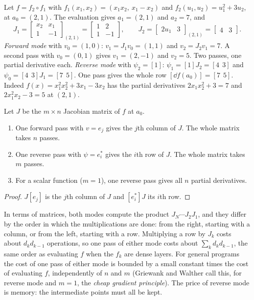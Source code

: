 \begin{notechapter}
\begin{example}\label{chain-rule-autodiff:ex:hand}
Let $f = f_2\circ f_1$ with
$f_1(x_1, x_2) = (x_1x_2,\ x_1 - x_2)$ and
$f_2(u_1, u_2) = u_1^2 + 3u_2$, at $a_0 = (2, 1)$. The evaluation gives
$a_1 = (2, 1)$ and $a_2 = 7$, and
\[
  J_1 = \begin{bmatrix}x_2 & x_1\\1 & -1\end{bmatrix}_{(2, 1)}
      = \begin{bmatrix}1 & 2\\1 & -1\end{bmatrix},
  \qquad
  J_2 = \begin{bmatrix}2u_1 & 3\end{bmatrix}_{(2, 1)}
      = \begin{bmatrix}4 & 3\end{bmatrix} .
\]
\emph{Forward mode} with $v_0 = (1, 0)$: $v_1 = J_1v_0 = (1, 1)$ and
$v_2 = J_2v_1 = 7$. A second pass with $v_0 = (0, 1)$ gives
$v_1 = (2, -1)$ and $v_2 = 5$. Two passes, one partial derivative each.
\emph{Reverse mode} with $\psi_2 = [1]$: $\psi_1 = [1]J_2 = [4\ \ 3]$ and
$\psi_0 = [4\ \ 3]J_1 = [7\ \ 5]$. One pass gives the whole row
$[\dd f(a_0)] = [7\ \ 5]$. Indeed
$f(x) = x_1^2x_2^2 + 3x_1 - 3x_2$ has the partial derivatives
$2x_1x_2^2 + 3 = 7$ and $2x_1^2x_2 - 3 = 5$ at $(2, 1)$.
\end{example}

\begin{proposition}\label{chain-rule-autodiff:prop:cost}
Let $J$ be the $m\times n$ Jacobian matrix of $f$ at $a_0$.
\begin{enumerate}[nosep]
  \item One forward pass with $v = e_j$ gives the $j$th column of $J$. The
        whole matrix takes $n$ passes.
  \item One reverse pass with $\psi = e_i^*$ gives the $i$th row of $J$.
        The whole matrix takes $m$ passes.
  \item For a scalar function ($m = 1$), one reverse pass gives all $n$
        partial derivatives.
\end{enumerate}
\end{proposition}

\begin{proof}
$J[e_j]$ is the $j$th column of $J$ and $[e_i^*]J$ its $i$th row.
\end{proof}

In terms of matrices, both modes compute the product
$J_N\cdots J_2J_1$, and they differ by the order in which the
multiplications are done: from the right, starting with a column, or from
the left, starting with a row. Multiplying a row by $J_k$ costs about
$d_kd_{k-1}$ operations, so one pass of either mode costs about
$\sum_kd_kd_{k-1}$, the same order as evaluating $f$ when the $f_k$ are
dense layers. For general programs the cost of one pass of either mode is
bounded by a small constant times the cost of evaluating $f$,
independently of $n$ and $m$ (Griewank and Walther call this, for reverse
mode and $m = 1$, the \emph{cheap gradient principle}). The price of
reverse mode is memory: the intermediate points must all be kept.


\end{notechapter}
